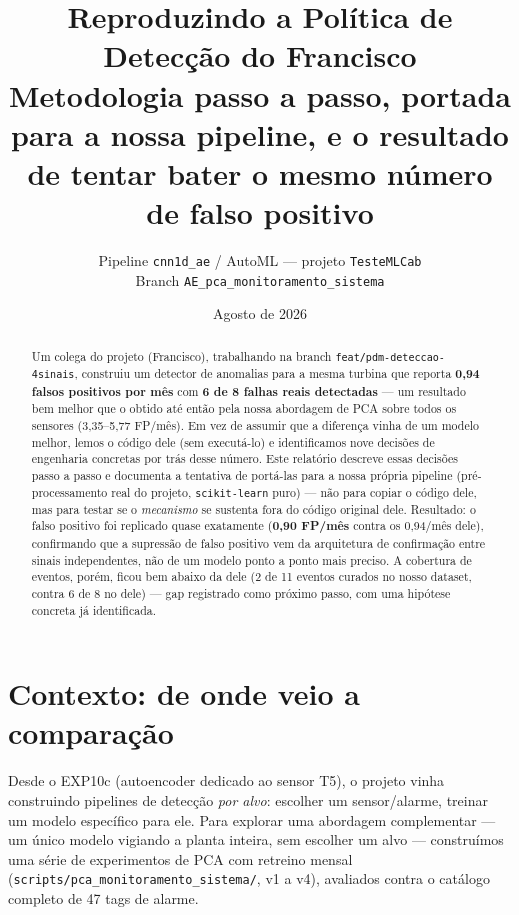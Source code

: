 \documentclass[11pt,a4paper]{article}
\title{Reproduzindo a Política de Detecção do Francisco\\
\large Metodologia passo a passo, portada para a nossa pipeline, e o resultado
de tentar bater o mesmo número de falso positivo}
\author{Pipeline \texttt{cnn1d\_ae} / AutoML --- projeto \texttt{TesteMLCab}\\
\small Branch \texttt{AE\_pca\_monitoramento\_sistema}}
\date{Agosto de 2026}
\begin{document}
\maketitle

\begin{abstract}
Um colega do projeto (Francisco), trabalhando na branch
\texttt{feat/pdm-deteccao-4sinais}, construiu um detector de anomalias
para a mesma turbina que reporta \textbf{0,94 falsos positivos por mês}
com \textbf{6 de 8 falhas reais detectadas} --- um resultado bem melhor
que o obtido até então pela nossa abordagem de PCA sobre todos os
sensores (3,35--5,77 FP/mês). Em vez de assumir que a diferença vinha de
um modelo melhor, lemos o código dele (sem executá-lo) e identificamos
nove decisões de engenharia concretas por trás desse número. Este
relatório descreve essas decisões passo a passo e documenta a tentativa
de portá-las para a nossa própria pipeline (pré-processamento real do
projeto, \texttt{scikit-learn} puro) --- não para copiar o código dele,
mas para testar se o \emph{mecanismo} se sustenta fora do código original
dele. Resultado: o falso positivo foi replicado quase exatamente
(\textbf{0,90 FP/mês} contra os 0,94/mês dele), confirmando que a
supressão de falso positivo vem da arquitetura de confirmação entre
sinais independentes, não de um modelo ponto a ponto mais preciso. A
cobertura de eventos, porém, ficou bem abaixo da dele (2 de 11 eventos
curados no nosso dataset, contra 6 de 8 no dele) --- gap registrado como
próximo passo, com uma hipótese concreta já identificada.
\end{abstract}

\tableofcontents

\section{Contexto: de onde veio a comparação}

Desde o EXP10c (autoencoder dedicado ao sensor T5), o projeto vinha
construindo pipelines de detecção \emph{por alvo}: escolher um
sensor/alarme, treinar um modelo específico para ele. Para explorar uma
abordagem complementar --- um único modelo vigiando a planta inteira,
sem escolher um alvo --- construímos uma série de experimentos de PCA
com retreino mensal (\texttt{scripts/pca\_monitoramento\_sistema/},
v1 a v4), avaliados contra o catálogo completo de 47 tags de alarme.
\end{document}
